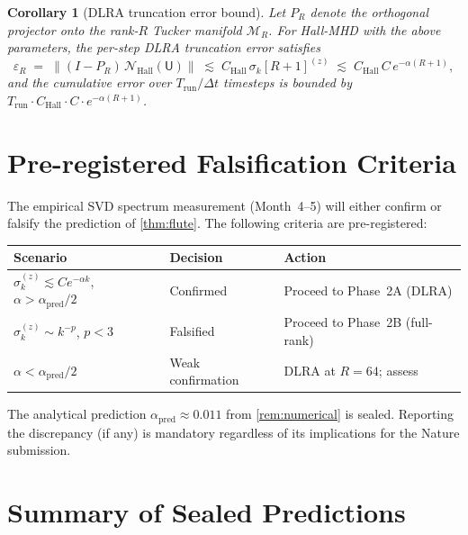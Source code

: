 \documentclass[12pt, a4paper]{article}
\newtheorem{corollary}[theorem]{Corollary}
\newcommand{\norm}[1]{\left\lVert #1 \right\rVert}
\newcommand{\eps}{\varepsilon}
\newcommand{\MR}{\mathcal{M}_R}
\newcommand{\PR}{P_R}
\newcommand{\NHall}{\mathcal{N}_\mathrm{Hall}}
\newcommand{\sigk}{\sigma_k}
\begin{document}
\begin{corollary}[DLRA truncation error bound]
\label{cor:dlra-error}
Let $P_R$ denote the orthogonal projector onto the rank-$R$ Tucker
manifold $\MR$.  For Hall-MHD with the above parameters, the per-step
DLRA truncation error satisfies
\begin{equation}
  \eps_R \;=\; \norm{(I - \PR)\,\NHall(\mathsf{U})}
  \;\lesssim\;
  C_\mathrm{Hall}\,\sigk[R+1]^{(z)}
  \;\lesssim\;
  C_\mathrm{Hall}\,C\,e^{-\alpha(R+1)},
  \label{eq:dlra-error}
\end{equation}
and the cumulative error over $T_\mathrm{run}/\Delta t$ timesteps is
bounded by $T_\mathrm{run} \cdot C_\mathrm{Hall} \cdot C \cdot e^{-\alpha(R+1)}$.
\end{corollary}

\section{Pre-registered Falsification Criteria}
\label{sec:falsification}

The empirical SVD spectrum measurement (Month~4--5) will either confirm or
falsify the prediction of \cref{thm:flute}.  The following criteria are
pre-registered:

\begin{center}
\begin{tabular}{lll}
\toprule
Scenario & Decision & Action \\
\midrule
$\sigk^{(z)} \lesssim C e^{-\alpha k}$,\;
  $\alpha > \alpha_\mathrm{pred}/2$ & Confirmed & Proceed to Phase~2A (DLRA) \\
$\sigk^{(z)} \sim k^{-p}$,\; $p < 3$ & Falsified & Proceed to Phase~2B (full-rank) \\
$\alpha < \alpha_\mathrm{pred}/2$ & Weak confirmation & DLRA at $R = 64$; assess \\
\bottomrule
\end{tabular}
\end{center}

The analytical prediction $\alpha_\mathrm{pred} \approx 0.011$ from
\cref{rem:numerical} is sealed.  Reporting the discrepancy (if any) is
mandatory regardless of its implications for the Nature submission.

\section{Summary of Sealed Predictions}
\label{sec:summary}
\end{document}
